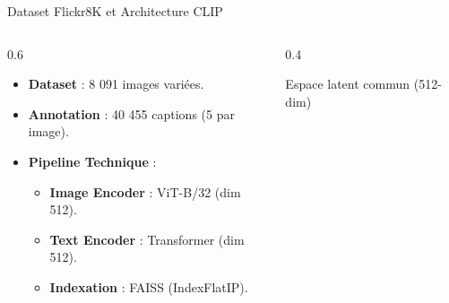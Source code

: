 \documentclass[aspectratio=169]{beamer}
\begin{document}
\begin{frame}{Dataset Flickr8K et Architecture CLIP}
    \begin{columns}[T]
        \begin{column}{0.6\textwidth}
            \begin{itemize}
                \item \textbf{Dataset} : 8 091 images variées.
                \item \textbf{Annotation} : 40 455 captions (5 par image).
                \item \textbf{Pipeline Technique} :
                \begin{itemize}
                    \item \textbf{Image Encoder} : ViT-B/32 (dim 512).
                    \item \textbf{Text Encoder} : Transformer (dim 512).
                    \item \textbf{Indexation} : FAISS (IndexFlatIP).
                \end{itemize}
            \end{itemize}
        \end{column}
        \begin{column}{0.4\textwidth}
            \centering
            \vspace{0.3cm}
            \tiny Espace latent commun (512-dim)
        \end{column}
    \end{columns}
\end{frame}
\end{document}
